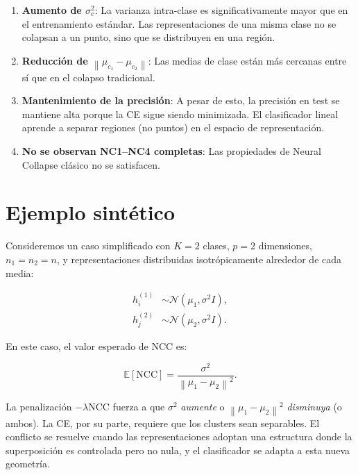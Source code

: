 \documentclass[12pt,a4paper]{report}
\newcommand{\E}{\mathbb{E}}
\newcommand{\norm}[1]{\left\lVert#1\right\rVert}
\newcommand{\NCC}{\text{NCC}}
\begin{document}
\begin{enumerate}
    \item \textbf{Aumento de $\sigma_c^2$}: La varianza intra-clase es significativamente mayor que en el entrenamiento estándar. Las representaciones de una misma clase no se colapsan a un punto, sino que se distribuyen en una región.

    \item \textbf{Reducción de $\norm{\mu_{c_1} - \mu_{c_2}}$}: Las medias de clase están más cercanas entre sí que en el colapso tradicional.

    \item \textbf{Mantenimiento de la precisión}: A pesar de esto, la precisión en test se mantiene alta porque la CE sigue siendo minimizada. El clasificador lineal aprende a separar regiones (no puntos) en el espacio de representación.

    \item \textbf{No se observan NC1--NC4 completas}: Las propiedades de Neural Collapse clásico no se satisfacen.
\end{enumerate}

\section{Ejemplo sintético}

Consideremos un caso simplificado con $K=2$ clases, $p=2$ dimensiones, $n_1=n_2=n$, y representaciones distribuidas isotrópicamente alrededor de cada media:

\begin{align}
    h_i^{(1)} &\sim \mathcal{N}(\mu_1, \sigma^2 I), \\
    h_j^{(2)} &\sim \mathcal{N}(\mu_2, \sigma^2 I).
\end{align}

En este caso, el valor esperado de NCC es:

\begin{equation}
    \E[\NCC] = \frac{\sigma^2}{\norm{\mu_1 - \mu_2}^2}.
\end{equation}

La penalización $-\lambda\NCC$ fuerza a que $\sigma^2$ \emph{aumente} o $\norm{\mu_1 - \mu_2}^2$ \emph{disminuya} (o ambos). La CE, por su parte, requiere que los clusters sean separables. El conflicto se resuelve cuando las representaciones adoptan una estructura donde la superposición es controlada pero no nula, y el clasificador se adapta a esta nueva geometría.

\end{document}

